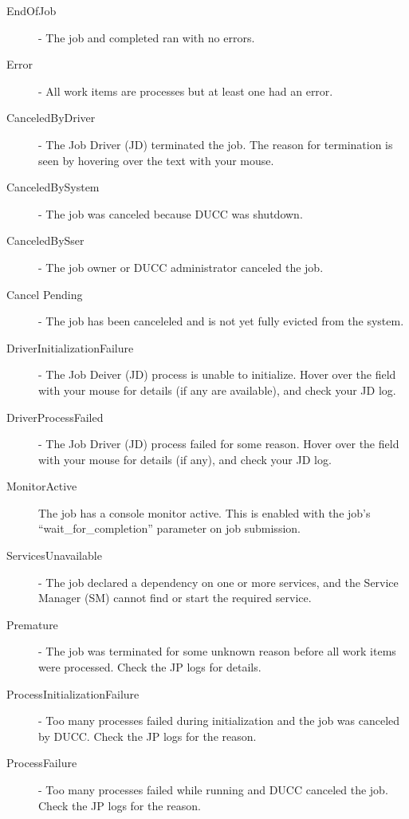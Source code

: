 \begin{description}
              \begin{description}
                  \item[EndOfJob] - The job and completed ran with no errors. 
                  \item[Error] - All work items are processes but at least one had an error. 
                  \item[CanceledByDriver] - The Job Driver (JD) terminated the job. The reason for
                    termination is seen by hovering over the text with your mouse.
                  \item[CanceledBySystem] - The job was canceled because DUCC was shutdown. 
                  \item[CanceledBySser] - The job owner or DUCC administrator canceled the job. 
                  \item[Cancel Pending] - The job has been canceleled and is not yet fully evicted
                    from the system.
                  \item[DriverInitializationFailure] - The Job Deiver (JD) process is unable to initialize. Hover over 
                    the field with your mouse for details (if any are available), and check your JD log. 
                  \item[DriverProcessFailed] - The Job Driver (JD) process failed for some reason. Hover over the 
                    field with your mouse for details (if any), and check your JD log. 
                  \item[MonitorActive] The job has a console monitor active.  This is enabled with the
                    job's ``wait\_for\_completion'' parameter on job submission.
                  \item[ServicesUnavailable] - The job declared a dependency on one or more services, and the 
                    Service Manager (SM) cannot find or start the required service. 
                  \item[Premature] - The job was terminated for some unknown reason before all work items were 
                    processed. Check the JP logs for details. 
                  \item[ProcessInitializationFailure] - Too many processes failed during
                    initialization and the job was canceled by DUCC.  Check the JP logs for the
                    reason.
                  \item[ProcessFailure] - Too many processes failed while running and DUCC canceled
                    the job.  Check the JP logs for the reason.

\end{description}
\end{description}

